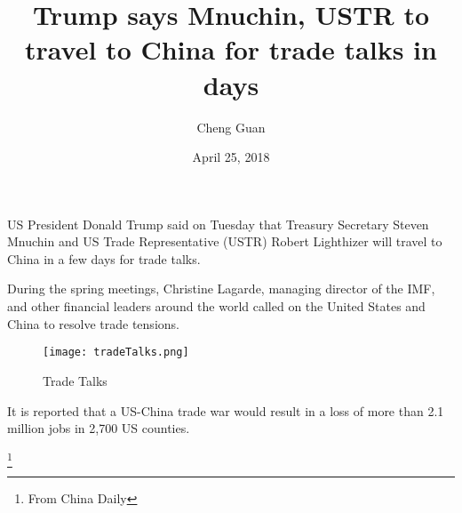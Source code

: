 \documentclass[12pt]{article}
\begin{document}
\title{Trump says Mnuchin, USTR to travel to China for trade talks in days}
\author{Cheng Guan}
\date{April 25, 2018}
\maketitle
\par
   US President Donald Trump said on Tuesday that Treasury Secretary Steven Mnuchin
   and US Trade Representative (USTR) Robert Lighthizer will travel to China in a few days for trade talks.
\par
   During the spring meetings, Christine Lagarde, managing director of the IMF,\cite{test1}
  and other financial leaders around the world called on the United States and China to resolve trade tensions.
 \begin{figure}[ht]
 \centering
 \texttt{[image: tradeTalks.png]}
 \caption{Trade Talks}
\end{figure}
\par
  It is reported that a US-China trade war would result in
 a loss of more than 2.1 million jobs in 2,700 US counties.


  \footnote{\centering From China Daily}
\end{document}
